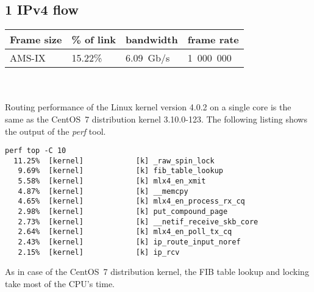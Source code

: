 
\subsection{1 IPv4 flow}
\begin{tabular}{ | l | l | l | l | }
\hline
Frame size & \% of link & bandwidth & frame rate \\
\hline
AMS-IX & 15.22\% &  6.09~Gb/s & 1~000~000 \\
\hline
\end{tabular}
\\
\\
Routing performance of the Linux kernel version 4.0.2 on a single core is the same as the CentOS~7 distribution kernel 3.10.0-123.
The following listing shows the output of the {\it{perf}} tool.
\begin{lstlisting}
perf top -C 10
  11.25%  [kernel]            [k] _raw_spin_lock
   9.69%  [kernel]            [k] fib_table_lookup
   5.58%  [kernel]            [k] mlx4_en_xmit
   4.87%  [kernel]            [k] __memcpy
   4.65%  [kernel]            [k] mlx4_en_process_rx_cq
   2.98%  [kernel]            [k] put_compound_page
   2.73%  [kernel]            [k] __netif_receive_skb_core
   2.64%  [kernel]            [k] mlx4_en_poll_tx_cq
   2.43%  [kernel]            [k] ip_route_input_noref
   2.15%  [kernel]            [k] ip_rcv
\end{lstlisting}
As in case of the CentOS~7 distribution kernel,
the FIB table lookup and locking take most of the CPU's time.
